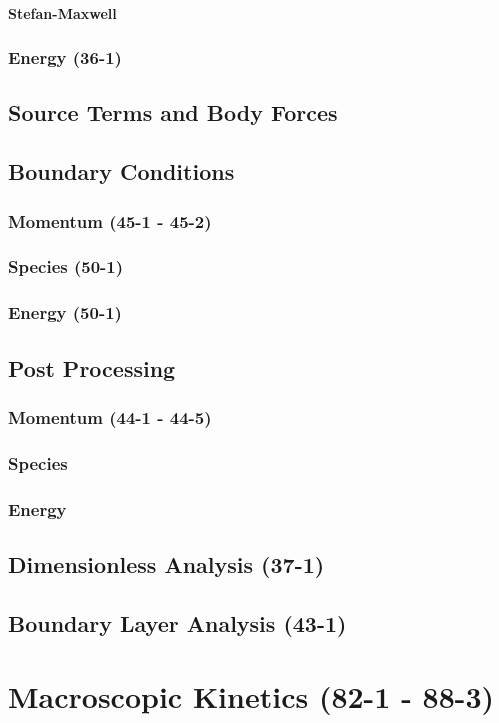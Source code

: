 \documentclass{mitqualif}
\begin{document}
\subsubsection{Stefan-Maxwell}
\subsection{Energy (36-1)}
%
\section{Source Terms and Body Forces}
\section{Boundary Conditions}
\subsection{Momentum (45-1 - 45-2)}
\subsection{Species (50-1)}
\subsection{Energy (50-1)}
\section{Post Processing}
\subsection{Momentum (44-1 - 44-5)}
\subsection{Species}
\subsection{Energy}
\section{Dimensionless Analysis (37-1)}
\section{Boundary Layer Analysis (43-1)}
\newpage
\chapter{Macroscopic Kinetics (82-1 - 88-3)}
\newpage
\end{document}
